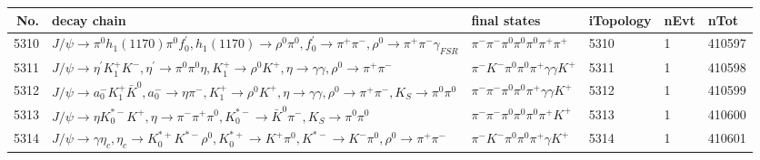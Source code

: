 \begin{table}[htbp] 
\begin{center}
\begin{small}
\begin{tabular}{rlllll}\hline\hline
 No. & decay chain & final states &  iTopology & nEvt & nTot \\\hline
5310&$J/\psi       \rightarrow \pi^{0}        h_{1}(1170)    \pi^{0}        f^{'}_{0}     , h_{1}(1170)     \rightarrow \rho^{0}      \pi^{0}        , f^{'}_{0}      \rightarrow \pi^{+}        \pi^{-}        , \rho^{0}       \rightarrow \pi^{+}        \pi^{-}        \gamma_{FSR} $&$\pi^{-}        \pi^{-}        \pi^{0}        \pi^{0}        \pi^{0}        \pi^{+}        \pi^{+}        $& 5310&    1&410597\\
5311&$J/\psi       \rightarrow \eta^{\prime} K_1^{+}        K^{-}          , \eta^{\prime}  \rightarrow \pi^{0}        \pi^{0}        \eta          , K_1^{+}         \rightarrow \rho^{0}      K^{+}          , \eta           \rightarrow \gamma       \gamma       , \rho^{0}       \rightarrow \pi^{+}        \pi^{-}        $&$\pi^{-}        K^{-}          \pi^{0}        \pi^{0}        \pi^{+}        \gamma       \gamma       K^{+}          $& 5311&    1&410598\\
5312&$J/\psi       \rightarrow a_{0}^{-}      K_1^{+}        \bar{K}^{0}   , a_{0}^{-}       \rightarrow \eta          \pi^{-}        , K_1^{+}         \rightarrow \rho^{0}      K^{+}          , \eta           \rightarrow \gamma       \gamma       , \rho^{0}       \rightarrow \pi^{+}        \pi^{-}        , K_{S}           \rightarrow \pi^{0}        \pi^{0}        $&$\pi^{-}        \pi^{-}        \pi^{0}        \pi^{0}        \pi^{+}        \gamma       \gamma       K^{+}          $& 5312&    1&410599\\
5313&$J/\psi       \rightarrow \eta          K_{0}^{*-}     K^{+}          , \eta           \rightarrow \pi^{-}        \pi^{+}        \pi^{0}        , K_{0}^{*-}      \rightarrow \bar{K}^{0}   \pi^{-}        , K_{S}           \rightarrow \pi^{0}        \pi^{0}        $&$\pi^{-}        \pi^{-}        \pi^{0}        \pi^{0}        \pi^{0}        \pi^{+}        K^{+}          $& 5313&    1&410600\\
5314&$J/\psi       \rightarrow \gamma       \eta_{c}    , \eta_{c}     \rightarrow K_{0}^{*+}     K^{*-}         \rho^{0}      , K_{0}^{*+}      \rightarrow K^{+}          \pi^{0}        , K^{*-}          \rightarrow K^{-}          \pi^{0}        , \rho^{0}       \rightarrow \pi^{+}        \pi^{-}        $&$\pi^{-}        K^{-}          \pi^{0}        \pi^{0}        \pi^{+}        \gamma       K^{+}          $& 5314&    1&410601\\

\end{tabular}
\end{small}
\end{center}
\end{table}
